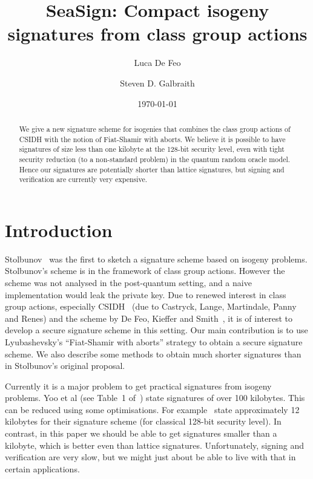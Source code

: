 \documentclass{llncs}
\title{SeaSign: Compact isogeny signatures from class group actions}
\author{Luca De Feo \and Steven D. Galbraith}
\institute{Mathematics Department, University of Auckland, NZ.
\email{s.galbraith@auckland.ac.nz}
\and
Universit{\' e} de Versailles -- Saint-Quentin, Paris, France.
\email{luca.de-feo@uvsq.fr}}
\date{\today}
\begin{document}
\pagestyle{plain}

\maketitle


\begin{abstract}
We give a new signature scheme for isogenies that combines the class group actions of CSIDH with the notion of Fiat-Shamir with aborts.
We believe it is possible to have signatures of size less than one kilobyte at the 128-bit security level, even with tight security reduction (to a non-standard problem) in the quantum random oracle model.
Hence our signatures are potentially shorter than lattice signatures, but signing and verification are currently very expensive.
\end{abstract}



\section{Introduction}

Stolbunov~\cite{Sto12} was the first to sketch a signature scheme based on isogeny problems.
Stolbunov's scheme is in the framework of class group actions.
However the scheme was not analysed in the post-quantum setting, and a naive implementation would leak the private key.
Due to renewed interest in class group actions, especially CSIDH~\cite{CLMPR18} (due to Castryck, Lange, Martindale, Panny and Renes) and the scheme by De Feo, Kieffer and Smith~\cite{DFKS18}, it is of interest to develop a secure signature scheme in this setting.
Our main contribution is to use Lyubashevsky's ``Fiat-Shamir with aborts'' strategy to obtain a secure signature scheme.
We also describe some methods to obtain much shorter signatures than in Stolbunov's original proposal.




Currently it is a major problem to get practical signatures from isogeny problems.
Yoo et al (see Table~1 of~\cite{YAJJS17}) state signatures of over 100 kilobytes.
This can be reduced using some optimisations. For example~\cite{GPS17} state approximately 12 kilobytes for their signature scheme (for classical 128-bit security level).
In contrast, in this paper we should be able to get signatures smaller than a kilobyte, which is better even than lattice signatures.
Unfortunately, signing and verification are very slow, but we might just about be able to live with that in certain applications.
\end{document}
